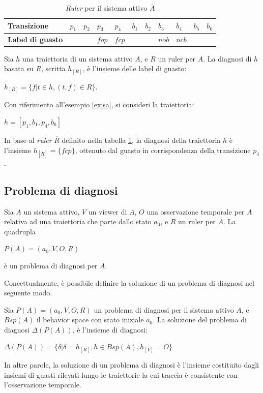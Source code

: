 \begin{table}[htbp] 
\begin{tabularx}{\textwidth}{l X X X X X X X X X X}
\hline
\textbf{Transizione} & $p_1$ & $p_2$ & $p_3$ & $p_4$ & $b_1$ & $b_2$ & $b_3$ & $b_4$ & $b_5$ & $b_6$\\
\hline
\textbf{Label di guasto} &  &  & $fop$ & $fcp$ &  &  & $nob$ & $ncb$ &  & \\
\hline
\end{tabularx}
\caption{\emph{Ruler} per il sistema attivo $\overline{A}$}
\label{tab:ruler}
\end{table}

\begin{defn}
Sia $h$ una traiettoria di un sistema attivo $A$, e $R$ un ruler per $A$. La diagnosi di $h$ basata su $R$, scritta $h_{[R]}$, è l'insieme delle label di guasto:
\begin{center}
	$h_{[R]} = \{ f | t \in h, (t,f) \in R \}$.
\end{center}
\end{defn}

\begin{ex}
Con riferimento all'esempio \ref{ex:sa}, si consideri la traiettoria:
\begin{center}
$h = [p_1,b_1,p_4,b_6]$
\end{center} 
In base al \emph{ruler} $\overline{R}$ definito nella tabella \ref{tab:ruler}, la diagnosi della traiettoria $h$ è l'insieme $h_{[\overline{R}]} = \{fcp\}$, ottenuto dal guasto in corrispondenza della transizione $p_4$.
\end{ex}

\subsection{Problema di diagnosi}
\begin{defn}
Sia $A$ un sistema attivo, $V$ un viewer di $A$, $O$ una osservazione temporale per $A$ relativa ad una traiettoria che parte dallo stato $a_0$, e $R$ un ruler per $A$. La quadrupla
\begin{center}
	$P(A) = (a_0,V,O,R)$
\end{center}
è un problema di diagnosi per $A$.
\end{defn}
Concettualmente, è possibile definire la soluzione di un problema di diagnosi nel seguente modo.
\begin{defn}
Sia $P(A) = (a_0,V,O,R)$ un problema di diagnosi per il sistema attivo $A$, e $Bsp(A)$ il behavior space con stato iniziale $a_0$. La soluzione del problema di diagnosi $\Delta(P(A))$, è l'insieme di diagnosi:
\begin{center}
	$\Delta(P(A)) = \{ \delta | \delta = h_{[R]}, h \in Bsp(A), h_{[V]} = O\}$
\end{center}
\end{defn}
In altre parole, la soluzione di un problema di diagnosi è l'insieme costituito dagli insiemi di guasti rilevati lungo le traiettorie la cui traccia è consistente con l'osservazione temporale.

